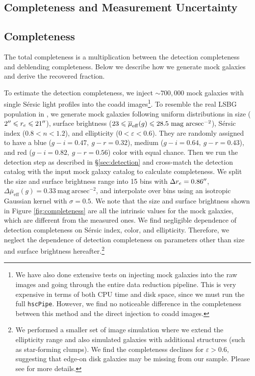 \documentclass[twocolumn,astrosymb,twocolappendix]{aastex631}
\newcommand{\sbunit}{\mathrm{mag\ arcsec}^{-2}}
\newcommand{\sbeff}{\overline{\mu}_{\mathrm{eff}}(g)}
\newcommand{\code}[1]{\texttt{#1}}
\newcommand{\sersic}{S\'ersic}
\begin{document}
\begin{CJK*}{UTF8}{gbsn}
\section{Completeness and Measurement Uncertainty}\label{ap:comp_meas_unc}
\subsection{Completeness}
The total completeness is a multiplication between the detection completeness and deblending completeness. Below we describe how we generate mock galaxies and derive the recovered fraction. 

To estimate the detection completeness, we inject $\sim 700,000$ mock galaxies with single \sersic{} light profiles into the coadd images\footnote{We have also done extensive tests on injecting mock galaxies into the raw images and going through the entire data reduction pipeline. This is very expensive in terms of both CPU time and disk space, since we must run the full \code{hscPipe}. However, we find no noticeable difference in the completeness between this method and the direct injection to coadd images.}. To resemble the real LSBG population in , we generate mock galaxies following uniform distributions in size ($2\mbox{$^{\prime\prime}$} \leqslant r_{e} \leqslant 21\mbox{$^{\prime\prime}$}$), surface brightness ($23 \leqslant \overline{\mu}_{\rm eff}(g) \leqslant 28.5\ \mathrm{mag\ arcsec^{-2}}$), \sersic{} index ($0.8 < n < 1.2$), and ellipticity ($0 < \varepsilon < 0.6$). They are randomly assigned to have a blue ($g-i=0.47,\ g-r=0.32$), medium ($g-i=0.64,\ g-r=0.43$), and red ($g-i=0.82,\ g-r=0.56$) color with equal chance. Then we run the detection step as described in \S \ref{sec:detection} and cross-match the detection catalog with the input mock galaxy catalog to calculate completeness. We split the size and surface brightness range into 15 bins with $\Delta r_e = 0.86\mbox{$^{\prime\prime}$}$, $\Delta \sbeff = 0.33\ \sbunit$, and interpolate over bins using an isotropic Gaussian kernel with $\sigma = 0.5$. We note that the size and surface brightness shown in Figure \ref{fig:completeness} are all the intrinsic values for the mock galaxies, which are different from the measured ones. We find negligible dependence of detection completeness on \sersic{} index, color, and ellipticity. Therefore, we neglect the dependence of detection completeness on parameters other than size and surface brightness hereafter.\footnote{We performed a smaller set of image simulation where we extend the ellipticity range and also simulated galaxies with additional structures (such as star-forming clumps). We find the completeness declines for $\varepsilon > 0.6$, suggesting that edge-on disk galaxies may be missing from our sample. Please see \citet{Greene2022} for more details.}


\end{CJK*}
\end{document}
